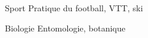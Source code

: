 

\begin{cvpairs}

  
\cvpair
    {Sport} %
    {Pratique du football, VTT, ski} %


\cvpair
    {Biologie} %
    {Entomologie, botanique} %

\end{cvpairs}
